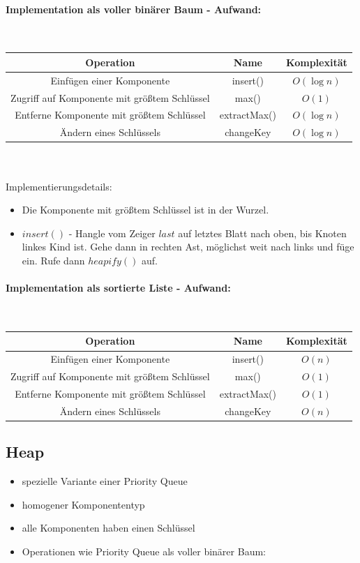\documentclass[fleqn]{scrartcl}
\begin{document}
\paragraph*{Implementation als voller binärer Baum - Aufwand:} $ $\\
\begin{tabular} {c c c}
Operation & Name & Komplexität\\
\hline
Einfügen einer Komponente & insert() & $O (\log n)$\\
Zugriff auf Komponente mit größtem Schlüssel & max() & $O (1)$\\
Entferne Komponente mit größtem Schlüssel & extractMax() & $O (\log n)$\\
Ändern eines Schlüssels & changeKey & $O (\log n)$\\
\end{tabular}\\\\
Implementierungsdetails:
\begin{itemize}
\item Die Komponente mit größtem Schlüssel ist in der Wurzel.
\item $insert()$ - Hangle vom Zeiger $last$ auf letztes Blatt nach oben, bis Knoten linkes Kind ist. Gehe dann in rechten Ast, möglichst weit nach links und füge ein. Rufe dann $heapify()$ auf.
\end{itemize}
\paragraph*{Implementation als sortierte Liste - Aufwand:} $ $\\
\begin{tabular} {c c c}
Operation & Name & Komplexität \\
\hline
Einfügen einer Komponente & insert() & $O (n)$\\
Zugriff auf Komponente mit größtem Schlüssel & max() & $O(1)$\\
Entferne Komponente mit größtem Schlüssel & extractMax() & $O(1)$\\
Ändern eines Schlüssels & changeKey & $O(n)$\\
\end{tabular}

\subsection{Heap}
\begin{itemize}
\item spezielle Variante einer Priority Queue
\item homogener Komponententyp
\item alle Komponenten haben einen Schlüssel
\item Operationen wie Priority Queue als voller binärer Baum:
\end{itemize}
\end{document}

